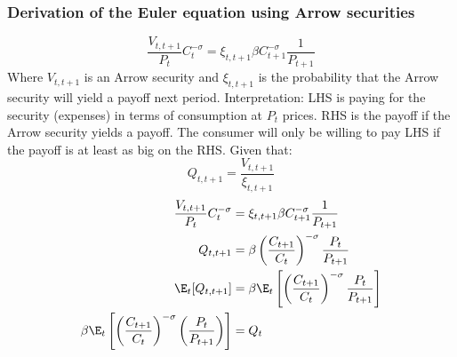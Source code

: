 \subsubsection{Derivation of the Euler equation using Arrow securities}
\begin{equation}
    \frac{V_{t,t+1}}{P_t}C_{t}^{-\sigma} = \xi_{t,t+1} \beta C_{t+1}^{-\sigma} \frac{1}{P_{t+1}} \label{eq:introduces_arrow_securities}
\end{equation}
Where $V_{t,t+1}$ is an Arrow security and $\xi_{t,t+1}$ is the probability that the Arrow security will yield a payoff next period. Interpretation: LHS is paying for the security (expenses) in terms of consumption at $P_t$ prices. RHS is the payoff if the Arrow security yields a payoff. The consumer will only be willing to pay LHS if the payoff is at least as big on the RHS.
Given that:
\begin{equation}
    Q_{t,t+1} = \frac{V_{t,t+1}}{\xi_{t,t+1}}
\end{equation}
\begin{align}
    \frac{V_{t,t+1}}{P_t}C_{t}^{-\sigma} &= \xi_{t,t+1} \beta C_{t+1}^{-\sigma} \frac{1}{P_{t+1}} \\
    Q_{t,t+1} &= \beta \left(\frac{C_{t+1}}{C_{t}}\right)^{-\sigma} \frac{P_t}{P_{t+1}}           \\
    \E_t [Q_{t,t+1}] &= \beta \E_t\left[\left(\frac{C_{t+1}}{C_{t}}\right)^{-\sigma} \frac{P_t}{P_{t+1}}\right] \\
    \beta\E_t\left[\left(\frac{C_{t+1}}{C_{t}}\right)^{-\sigma} \left(\frac{P_{t}}{ P_{t+1}}\right)\right]             &= Q_t \label{eq:euler_w_arrow}
\end{align}
\newpage